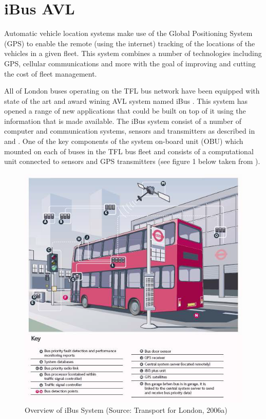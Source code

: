 \section{iBus AVL}
Automatic vehicle location systems make use of the Global Positioning System (GPS) to enable the remote (using the internet) tracking of the locations of the vehicles in a given fleet. This system combines a number of technologies including GPS, cellular communications and more with the goal of improving and cutting the cost of fleet management. 

All of London buses operating on the TFL bus network have been equipped with state of the art and award wining \cite{ibusAward} AVL system named iBus \cite{ibus}. This system has opened a range of new applications that could be built on top of it using the information that is made available. The iBus system consist of a number of computer and communication systems, sensors and transmitters as described in \cite{Hounsell201276} and \cite{eps354267}.
One of the key components of the system on-board unit (OBU) which mounted on each of
buses in the TFL bus fleet and consists of a computational unit connected to
sensors and GPS transmitters (see figure 1 below taken from \cite{Hounsell201276}). 
\begin{figure}[ht!]
\centering
	\includegraphics[scale=0.8]{Figures/iBus.png}
\caption{Overview of iBus System (Source: Transport for London, 2006a) \label{overflow}}
\end{figure}
